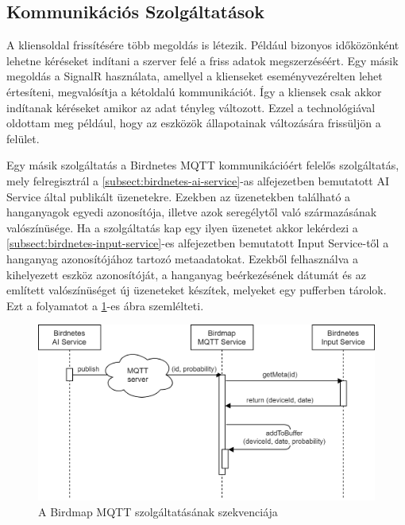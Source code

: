 \subsection{Kommunikációs Szolgáltatások}
A kliensoldal frissítésére több megoldás is létezik. Például bizonyos időközönként lehetne kéréseket indítani a szerver felé a friss adatok megszerzéséért.
Egy másik megoldás a SignalR használata, amellyel a klienseket eseményvezérelten lehet értesíteni, megvalósítja a kétoldalú kommunikációt.
Így a kliensek csak akkor indítanak kéréseket amikor az adat tényleg változott. Ezzel a technológiával oldottam meg például, hogy az eszközök állapotainak változására
frissüljön a felület.

Egy másik szolgáltatás a Birdnetes MQTT kommunikációért felelős szolgáltatás, 
mely felregisztrál a \ref{subsect:birdnetes-ai-service}-as alfejezetben bemutatott AI Service által publikált üzenetekre.
Ezekben az üzenetekben található a hanganyagok egyedi azonosítója, illetve azok seregélytől való származásának valószínüsége.
Ha a szolgáltatás kap egy ilyen üzenetet akkor lekérdezi a \ref{subsect:birdnetes-input-service}-es alfejezetben bemutatott Input Service-től
a hanganyag azonosítójához tartozó metaadatokat. 
Ezekből felhasználva a kihelyezett eszköz azonosítóját, a hanganyag beérkezésének dátumát és az említett valószínüséget új üzeneteket készítek, melyeket egy pufferben tárolok.
Ezt a folyamatot a \ref{fig:birdmap-mqtt-service}-es ábra szemlélteti.

\begin{figure}[!ht]
    \centering
    \includegraphics[width=150mm, keepaspectratio]{figures/mqtt-communication-sequence.png}
    \caption{A Birdmap MQTT szolgáltatásának szekvenciája}
    \label{fig:birdmap-mqtt-service}
\end{figure}

